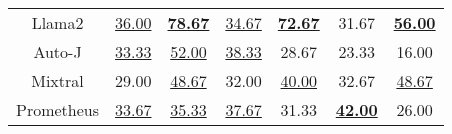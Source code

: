 \begin{table}[]
\begin{tabular}{c|cc|cc|cc}
        \rowcolor{gray!40}  \multicolumn{7}{c}{\textbf{SFT}} \\ \midrule
Llama2     & \underline{36.00} & \underline{\textbf{78.67}} & \underline{34.67} & \underline{\textbf{72.67}} & 31.67 & \underline{\textbf{56.00}} \\
Auto-J      & \underline{33.33} & \underline{52.00} & \underline{38.33} & 28.67 & 23.33 & 16.00 \\
Mixtral    & 29.00 & \underline{48.67} & 32.00 & \underline{40.00} & 32.67 & \underline{48.67} \\
Prometheus & \underline{33.67} & \underline{35.33} & \underline{37.67} & 31.33 & \underline{\textbf{42.00}} & 26.00 \\ \bottomrule
         
    \end{tabular}
    \label{tab:RQ3_res}
\vspace{-2.0em}
\end{table}


